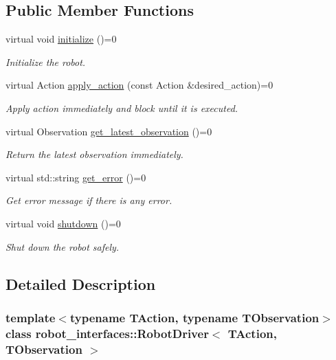\subsection*{Public Member Functions}
\begin{DoxyCompactItemize}
\item 
virtual void \hyperlink{classrobot__interfaces_1_1RobotDriver_af3cbef570a455e1f8085d701282264ff}{initialize} ()=0
\begin{DoxyCompactList}\small\item\em Initialize the robot. \end{DoxyCompactList}\item 
virtual Action \hyperlink{classrobot__interfaces_1_1RobotDriver_a4294e522fcd12b38d69f7d53fae5d74a}{apply\+\_\+action} (const Action \&desired\+\_\+action)=0
\begin{DoxyCompactList}\small\item\em Apply action immediately and block until it is executed. \end{DoxyCompactList}\item 
virtual Observation \hyperlink{classrobot__interfaces_1_1RobotDriver_ad13d4f4fdfe78bdde4fc964f07fa45e2}{get\+\_\+latest\+\_\+observation} ()=0
\begin{DoxyCompactList}\small\item\em Return the latest observation immediately. \end{DoxyCompactList}\item 
virtual std\+::string \hyperlink{classrobot__interfaces_1_1RobotDriver_acdf4c5d6993b836a180e6b6fc12b3445}{get\+\_\+error} ()=0
\begin{DoxyCompactList}\small\item\em Get error message if there is any error. \end{DoxyCompactList}\item 
virtual void \hyperlink{classrobot__interfaces_1_1RobotDriver_a3451fb8b15d2840b559f3ee858de01f8}{shutdown} ()=0
\begin{DoxyCompactList}\small\item\em Shut down the robot safely. \end{DoxyCompactList}\end{DoxyCompactItemize}


\subsection{Detailed Description}
\subsubsection*{template$<$typename T\+Action, typename T\+Observation$>$\newline
class robot\+\_\+interfaces\+::\+Robot\+Driver$<$ T\+Action, T\+Observation $>$}


